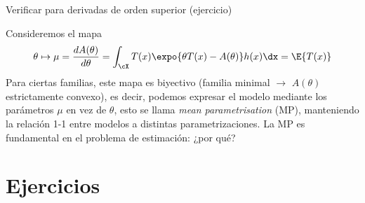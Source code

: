 \begin{example}
Verificar para derivadas de orden superior (ejercicio)
\end{example}


\begin{remark}
Consideremos el mapa
\begin{equation}
    \theta \mapsto \mu = \frac{dA(\theta)}{d\theta} = \int_\cX T (x) \expo{\theta T (x) -A(\theta)}h(x)\dx =\E{T(x)}
\end{equation}
Para ciertas familias, este mapa es biyectivo (familia minimal $\rightarrow$ $A(\theta)$ estrictamente convexo), es decir, podemos expresar el modelo mediante los parámetros $\mu$ en vez de $\theta$, esto se llama \emph{mean parametrisation} (MP), manteniendo la relación 1-1 entre modelos a distintas parametrizaciones. La MP es fundamental en el problema de estimación: ¿por qué?

\end{remark}

\section{Ejercicios}

